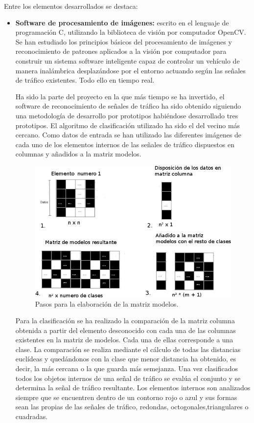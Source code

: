 \documentclass[a4paper,12pt]{article}
\begin{document}
Entre los elementos desarrollados se destaca:

\begin{itemize}

\item \textbf{Software de procesamiento de imágenes:} escrito en el lenguaje de programación C, utilizando la biblioteca de visión por computador OpenCV. Se han estudiado los principios básicos del procesamiento de imágenes y reconocimiento de patrones aplicados a la visión por computador para construir un sistema software inteligente capaz de controlar un vehículo de manera inalámbrica desplazándose por el entorno actuando según las señales de tráfico existentes. Todo ello en tiempo real.

Ha sido la parte del proyecto en la que más tiempo se ha invertido, el software de reconocimiento de señales de tráfico ha sido obtenido siguiendo una metodología de desarrollo por prototipos habiéndose desarrollado tres prototipos. El algoritmo de clasificación utilizado ha sido el del vecino más cercano. Como datos de entrada se han utilizado las diferentes imágenes de cada uno de los elementos internos de las señales de tráfico dispuestos en columnas y añadidos a la matriz modelos. 

\begin{figure}[H]
  \begin{center}
    \includegraphics[scale=0.4]{imagenes/entrenamiento.png}
  \end{center}
  \caption{Pasos para la elaboración de la matriz modelos.}
  \label{fig:com-coche-pc}
\end{figure}


Para la clasificación se ha realizado la comparación de la matriz columna obtenida a partir del elemento desconocido con cada una de las columnas existentes en la matriz de modelos. Cada una de ellas corresponde a una clase. La comparación se realiza mediante el cálculo de todas las distancias euclídeas y quedándonos con la clase que menor distancia ha obtenido, es decir, la más cercana o la que guarda más semejanza. Una vez clasificados todos los objetos internos de una señal de tráfico se evalúa el conjunto y se determina la señal de tráfico resultante.  Los elementos internos son analizados siempre que se encuentren dentro de un contorno rojo o azul y sus formas sean las propias de las señales de tráfico, redondas, octogonales,triangulares o cuadradas.



\end{itemize}
\end{document}
